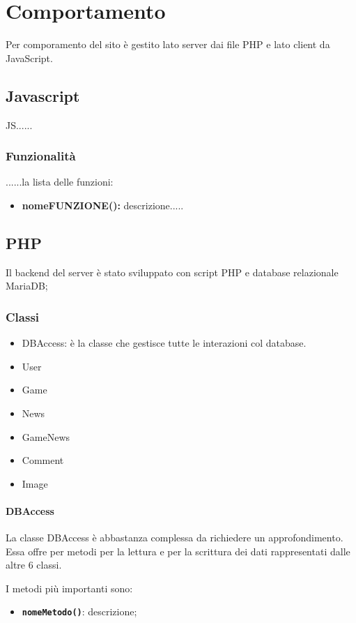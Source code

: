 \section{Comportamento}
Per comporamento del sito è gestito lato server dai file PHP e lato client da JavaScript.

\subsection{Javascript}
JS......

\subsubsection{Funzionalità}
......la lista delle funzioni:
\begin{itemize}
	\item \textbf{nomeFUNZIONE():} descrizione.....\\
\end{itemize}

\subsection{PHP}
Il backend del server è stato sviluppato con script PHP e database relazionale MariaDB;

\subsubsection{Classi}
\begin{itemize}
	\item DBAccess: è la classe che gestisce tutte le interazioni col database.
	\item User
	\item Game
	\item News
	\item GameNews
	\item Comment
	\item Image
\end{itemize}

\paragraph{DBAccess} 
La classe DBAccess è abbastanza complessa da richiedere un approfondimento.
Essa offre per metodi per la lettura e per la scrittura dei dati rappresentati dalle altre 6 classi.

I metodi più importanti sono:
\begin{itemize}
	\item \textbf{\texttt{nomeMetodo()}}: descrizione;

\end{itemize}


